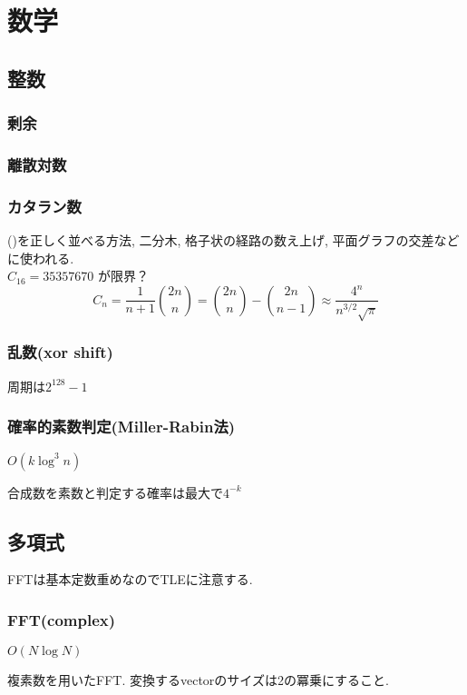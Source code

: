 
\section{数学}
\subsection{整数}
\subsubsection{剰余}


\subsubsection{離散対数}


\subsubsection{カタラン数}
()を正しく並べる方法, 二分木, 格子状の経路の数え上げ, 平面グラフの交差などに使われる. \\
$C_{16} = 35357670$ が限界？
\[ C_n = \frac{1}{n+1}\binom{2n}{n} = \binom{2n}{n}-\binom{2n}{n-1} \approx \frac{4^n}{n^{3/2}\sqrt{\pi}} \]

\subsubsection{乱数(xor shift)}
周期は$2^{128}-1$


\subsubsection{確率的素数判定(Miller-Rabin法)}
$O(k\log^3n)$\par
合成数を素数と判定する確率は最大で$4^{-k}$\\


\subsection{多項式}
FFTは基本定数重めなのでTLEに注意する.
\subsubsection{FFT(complex)}
$O(N \log N)$\par
複素数を用いたFFT. 変換するvectorのサイズは2の冪乗にすること.


